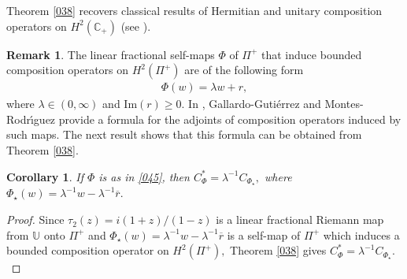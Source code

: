 \documentclass[11pt]{amsart}%
\newtheorem{cor}[thm]{Corollary}
\theoremstyle{definition}
\newtheorem{rem}[thm]{Remark}
\theoremstyle{remark}
\numberwithin{equation}{section}
\begin{document}

Theorem \ref{038} recovers classical results of Hermitian and unitary
composition operators on $H^{2}(\mathbb{C}_{+})$ (see \cite[Theorems 2.4 and
3.1]{Matache Inv and normal}).

\begin{rem}
	The linear fractional self-maps $\Phi$ of $\Pi^{+}$ that induce bounded
	composition operators on $H^{2}(\Pi^{+})$ are of the following
	form
	\begin{align}
	\label{045}\Phi(w)=\lambda w+r,
	\end{align}
	where $\lambda\in(0,\infty)$ and $\mathrm{Im}(r)\geq0.$ In \cite{Eva},
	Gallardo-Guti\'{e}rrez and Montes-Rodr\'{\i}guez provide a formula for the
	adjoints of composition operators induced by such maps. The next result shows that  this formula can be obtained from Theorem \ref{038}.
\end{rem}

\begin{cor}
	If $\Phi$ is as in \eqref{045}, then $C_{\Phi}^{\ast}=\lambda^{-1}%
	C_{\Phi_{\star}},$ where $\Phi_{\star}(w)=\lambda^{-1}w-\lambda^{-1}%
	\overline{r}.$
\end{cor}

\begin{proof}
	Since $\tau_{2}(z)=i(1+z)/(1-z)$ is a linear fractional Riemann map from
	$\mathbb{U}$ onto $\Pi^{+}$ and $\Phi_{\star}(w)=\lambda^{-1}%
	w-\lambda^{-1}\overline{r}$ is a self-map of $\Pi^{+}$ which induces a
	bounded composition operator on $H^{2}(\Pi^{+}),$ Theorem \ref{038}
	gives $C_{\Phi}^{*}=\lambda^{-1}C_{\Phi_{\star}}.$
\end{proof}




\end{document}
